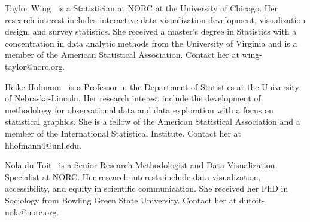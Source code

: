 \documentclass{IEEEcsmag}
\begin{document}
\begin{IEEEbiography}{Taylor Wing} {\,} is a Statistician at NORC at the University of Chicago. Her research interest includes interactive data visualization development, visualization design, and survey statistics. She received a master’s degree in Statistics with a concentration in data analytic methods from the University of Virginia and is a member of the American Statistical Association. Contact her at wing-taylor@norc.org.\vspace*{8pt}
\end{IEEEbiography}


\begin{IEEEbiography}{Heike Hofmann} {\,} is a Professor in the Department of Statistics at the University of Nebraska-Lincoln.  Her research interest include the development of methodology for observational data and data exploration with a focus on statistical graphics. She is a fellow of the American Statistical Association and a member of the International Statistical Institute. Contact her at hhofmann4@unl.edu.
\end{IEEEbiography}


\begin{IEEEbiography}{Nola du Toit} {\,} is a Senior Research Methodologist and Data Visualization Specialist at NORC. Her research interests include data visualization, accessibility, and equity in scientific communication. She received her PhD in Sociology from Bowling Green State University. Contact her at dutoit-nola@norc.org.
\end{IEEEbiography}
\end{document}
